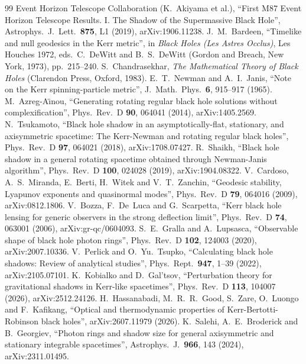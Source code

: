 \documentclass[11pt,a4paper]{article}
\theoremstyle{remark}
\numberwithin{equation}{section}
\begin{document}
\begin{thebibliography}{99}
 Event Horizon Telescope Collaboration (K.~Akiyama et al.), ``First M87 Event Horizon Telescope Results. I. The Shadow of the Supermassive Black Hole'', Astrophys.\ J.\ Lett.\ \textbf{875}, L1 (2019), arXiv:1906.11238.
 J.~M.~Bardeen, ``Timelike and null geodesics in the Kerr metric'', in \emph{Black Holes (Les Astres Occlus)}, Les Houches 1972, eds.\ C.~DeWitt and B.~S.~DeWitt (Gordon and Breach, New York, 1973), pp.\ 215--240.
 S.~Chandrasekhar, \emph{The Mathematical Theory of Black Holes} (Clarendon Press, Oxford, 1983).
 E.~T.~Newman and A.~I.~Janis, ``Note on the Kerr spinning-particle metric'', J.\ Math.\ Phys.\ \textbf{6}, 915--917 (1965).
 M.~Azreg-A\"{\i}nou, ``Generating rotating regular black hole solutions without complexification'', Phys.\ Rev.\ D \textbf{90}, 064041 (2014), arXiv:1405.2569.
 N.~Tsukamoto, ``Black hole shadow in an asymptotically-flat, stationary, and axisymmetric spacetime: The Kerr-Newman and rotating regular black holes'', Phys.\ Rev.\ D \textbf{97}, 064021 (2018), arXiv:1708.07427.
 R.~Shaikh, ``Black hole shadow in a general rotating spacetime obtained through Newman-Janis algorithm'', Phys.\ Rev.\ D \textbf{100}, 024028 (2019), arXiv:1904.08322.
 V.~Cardoso, A.~S.~Miranda, E.~Berti, H.~Witek and V.~T.~Zanchin, ``Geodesic stability, Lyapunov exponents and quasinormal modes'', Phys.\ Rev.\ D \textbf{79}, 064016 (2009), arXiv:0812.1806.
 V.~Bozza, F.~De~Luca and G.~Scarpetta, ``Kerr black hole lensing for generic observers in the strong deflection limit'', Phys.\ Rev.\ D \textbf{74}, 063001 (2006), arXiv:gr-qc/0604093.
 S.~E.~Gralla and A.~Lupsasca, ``Observable shape of black hole photon rings'', Phys.\ Rev.\ D \textbf{102}, 124003 (2020), arXiv:2007.10336.
 V.~Perlick and O.~Yu.~Tsupko, ``Calculating black hole shadows: Review of analytical studies'', Phys.\ Rept.\ \textbf{947}, 1--39 (2022), arXiv:2105.07101.
 K.~Kobialko and D.~Gal'tsov, ``Perturbation theory for gravitational shadows in Kerr-like spacetimes'', Phys.\ Rev.\ D \textbf{113}, 104007 (2026), arXiv:2512.24126.
 H.~Hassanabadi, M.~R.~R.~Good, S.~Zare, O.~Luongo and F.~Kafikang, ``Optical and thermodynamic properties of Kerr-Bertotti-Robinson black holes'', arXiv:2607.11979 (2026).
 K.~Salehi, A.~E.~Broderick and B.~Georgiev, ``Photon rings and shadow size for general axisymmetric and stationary integrable spacetimes'', Astrophys.\ J.\ \textbf{966}, 143 (2024), arXiv:2311.01495.

\end{thebibliography}
\end{document}
